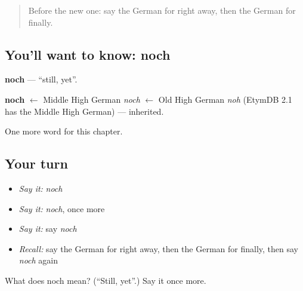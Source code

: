 \label{lesson:GE-C170-noch}



\begin{quote}
Before the new one: say the German for right away, then the German for finally.
\end{quote}

\subsection*{You'll want to know: noch}
\textbf{noch} — \textquotedblleft{}still, yet\textquotedblright{}.

\begin{cousinweb}
\textbf{noch} $\leftarrow$ Middle High German \emph{noch} $\leftarrow$ Old High German \emph{noh} (EtymDB 2.1 has the Middle High German) — inherited.
\end{cousinweb}

\begin{grammarlens}[title={What you've built}]
One more word for this chapter.
\end{grammarlens}

\subsection*{Your turn}
\begin{itemize}
\raggedright
  \item \emph{Say it:} \emph{noch}
  \item \emph{Say it:} \emph{noch}, once more
  \item \emph{Say it:} say \emph{noch}
  \item \emph{Recall:} say the German for right away, then the German for finally, then say \emph{noch} again
\end{itemize}

\begin{tcolorbox}[breakable,colback=teal!4,colframe=teal!35!black,title={Before you move on}]
What does noch mean? (\textquotedblleft{}Still, yet\textquotedblright{}.) Say it once more.
\end{tcolorbox}
